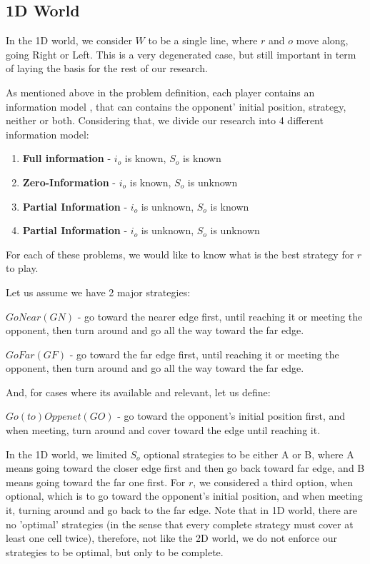 \documentclass[a4paper,english,10pt]{article}
\newcommand\rob{\ensuremath{r}\xspace}
\newcommand\opp{\ensuremath{o}\xspace}
\newcommand{\w}{\ensuremath{W}\xspace}
\newcommand{\gn}{\ensuremath{GN}\xspace}
\newcommand{\gf}{\ensuremath{GF}\xspace}
\newcommand{\go}{\ensuremath{GO}\xspace}
\begin{document}
\subsection{1D World}
In the 1D world, we consider \w to be a single line, where \rob and \opp move along, going Right or Left. This is a very degenerated case, but still important in term of laying the basis for the rest of our research.

As mentioned above in the problem definition, each player contains an information model , that can contains the opponent' initial position, strategy, neither or both. Considering that, we divide our research into 4 different information model:
\begin{enumerate}
\item \textbf{Full information} - $i_\opp$ is known, $S_\opp$ is known
\item \textbf{Zero-Information} - $i_\opp$ is known, $S_\opp$ is unknown
\item \textbf{Partial Information} -  $i_\opp$ is unknown, $S_\opp$ is known
\item \textbf{Partial Information} - $i_\opp$ is unknown, $S_\opp$ is unknown
\end{enumerate}

For each of these problems, we would like to know what is the best strategy for \rob to play.

Let us assume we have 2 major strategies:

$GoNear(\gn)$ - go toward the nearer edge first, until reaching it or meeting the opponent, then turn around and go all the way toward the far edge.

$GoFar(\gf)$ - go toward the far edge first, until reaching it or meeting the opponent, then turn around and go all the way toward the far edge.

And, for cases where its available and relevant, let us define:

$Go(to)Oppenet(\go)$ - go toward the opponent's initial position first, and when meeting, turn around and cover toward the edge until reaching it.

In the 1D world, we limited $S_\opp$ optional strategies to be either A or B, where A means going toward the closer edge first and then go back toward far edge, and B means going toward the far one first. For \rob, we considered a third option, when optional, which is to go toward the opponent's initial position, and when meeting it, turning around and go back to the far edge.
Note that in 1D world, there are no 'optimal' strategies (in the sense that every complete strategy must cover at least one cell twice), therefore, not like the 2D world, we do not enforce our strategies to be optimal, but only to be complete.
\end{document}
